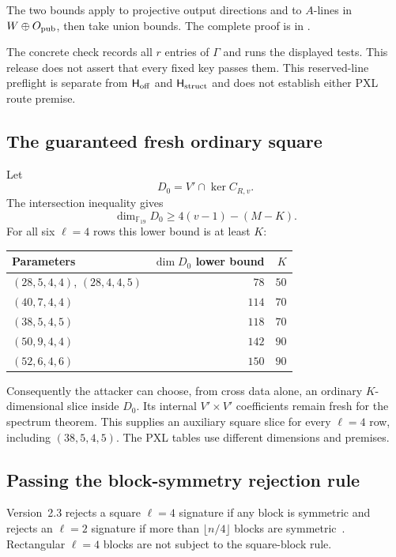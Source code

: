 \documentclass[11pt]{article}
\newcommand{\F}{\mathbb F}
\begin{document}
The two bounds apply  to projective output
directions and to $A$-lines in $W\oplus O_{\rm pub}$, then take union bounds.
The complete proof is in .

The concrete check records all $r$ entries of $\Gamma$ and runs the displayed
tests.  This release does not assert that every fixed key passes them.  This
reserved-line preflight is separate from $\mathsf H_{\rm off}$ and
$\mathsf H_{\rm struct}$ and does not establish either PXL route premise.

\subsection{The guaranteed fresh ordinary square}
Let
\[
  D_0=V'\cap\ker C_{R,v}.
\]
The intersection inequality gives
\begin{equation}
  \dim_{\F_{19}}D_0
  \ge 4(v-1)-(M-K).                                  \label{eq:fresh-slice-dim}
\end{equation}
For all six $\ell=4$ rows this lower bound is at least $K$:
\begin{center}
\small
\begin{tabular}{@{}l r r@{}}
\toprule
Parameters & $\dim D_0$ lower bound & $K$\\
\midrule
$(28,5,4,4)$, $(28,4,4,5)$ & $78$ & $50$\\
$(40,7,4,4)$ & $114$ & $70$\\
$(38,5,4,5)$ & $118$ & $70$\\
$(50,9,4,4)$ & $142$ & $90$\\
$(52,6,4,6)$ & $150$ & $90$\\
\bottomrule
\end{tabular}
\end{center}
Consequently the attacker can choose, from cross data alone, an ordinary
$K$-dimensional slice inside $D_0$.  Its internal $V'\times V'$ coefficients
remain fresh for the spectrum theorem.  This supplies an auxiliary square
slice for every $\ell=4$ row, including $(38,5,4,5)$.  The PXL tables use
different dimensions and premises.

\subsection{Passing the block-symmetry rejection rule}
Version~2.3 rejects a square $\ell=4$ signature if any block is symmetric and
rejects an $\ell=2$ signature if more than $\lfloor n/4\rfloor$ blocks are
symmetric~\cite{SNOVA23}.  Rectangular $\ell=4$ blocks are not subject to the
square-block rule.
\end{document}
